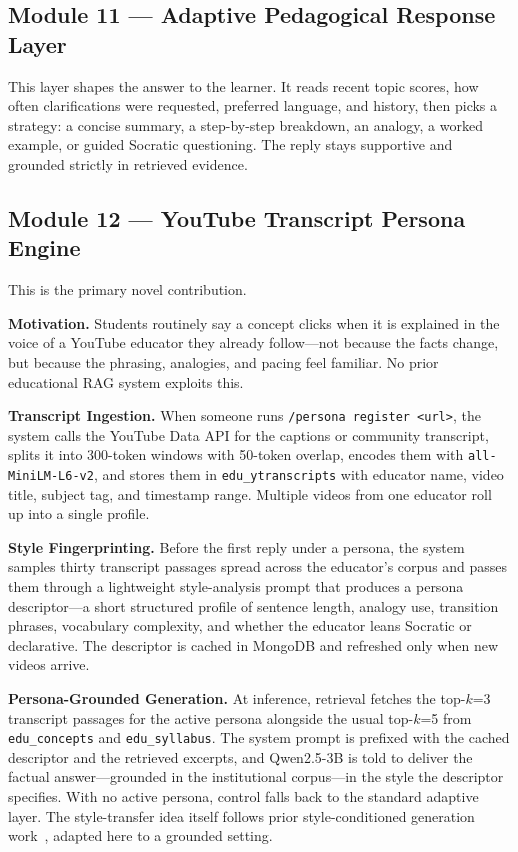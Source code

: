 \documentclass[conference]{IEEEtran}
\begin{document}
\subsection{Module 11 --- Adaptive Pedagogical Response Layer}
This layer shapes the answer to the learner. It reads recent topic
scores, how often clarifications were requested, preferred language,
and history, then picks a strategy: a concise summary, a step-by-step
breakdown, an analogy, a worked example, or guided Socratic questioning.
The reply stays supportive and grounded strictly in retrieved evidence.
\subsection{Module 12 --- YouTube Transcript Persona Engine}
This is the primary novel contribution.

\textbf{Motivation.} Students routinely say a concept clicks when it is
explained in the voice of a YouTube educator they already follow---not
because the facts change, but because the phrasing, analogies, and
pacing feel familiar. No prior educational RAG system exploits this.

\textbf{Transcript Ingestion.} When someone runs
\texttt{/persona register <url>}, the system calls the YouTube Data API
for the captions or community transcript, splits it into 300-token
windows with 50-token overlap, encodes them with
\texttt{all-MiniLM-L6-v2}, and stores them in \texttt{edu\_ytranscripts}
with educator name, video title, subject tag, and timestamp range.
Multiple videos from one educator roll up into a single profile.

\textbf{Style Fingerprinting.} Before the first reply under a persona,
the system samples thirty transcript passages spread across the
educator's corpus and passes them through a lightweight style-analysis
prompt that produces a persona descriptor---a short structured profile
of sentence length, analogy use, transition phrases, vocabulary
complexity, and whether the educator leans Socratic or declarative.
The descriptor is cached in MongoDB and refreshed only when new videos
arrive.

\textbf{Persona-Grounded Generation.} At inference, retrieval fetches
the top-$k$=3 transcript passages for the active persona alongside the
usual top-$k$=5 from \texttt{edu\_concepts} and \texttt{edu\_syllabus}.
The system prompt is prefixed with the cached descriptor and the
retrieved excerpts, and Qwen2.5-3B is told to deliver the
factual answer---grounded in the institutional corpus---in the style
the descriptor specifies. With no active persona, control falls back to
the standard adaptive layer. The style-transfer idea itself follows
prior style-conditioned generation work~\cite{li2023}, adapted here to
a grounded setting.
\end{document}
